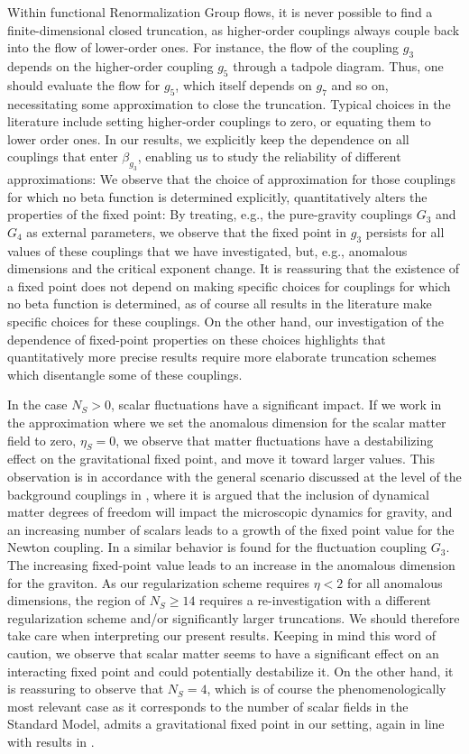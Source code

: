 \documentclass[11pt]{book} %
\begin{document}
Within functional Renormalization Group flows, it is never possible to find a finite-dimensional
closed truncation, as higher-order couplings always couple back into the flow of lower-order ones.
For instance, the flow of the coupling $g_3$ depends on the higher-order coupling $g_5$ through
a tadpole diagram. Thus, one should evaluate the flow for $g_5$,
which itself depends on $g_7$ and so on, necessitating some approximation to close the truncation.
Typical choices in the literature include setting higher-order couplings to zero,
or equating them to lower order ones. In our results,
we explicitly keep the dependence on all couplings that enter $\beta_{g_3}$,
enabling us to study the reliability of different approximations:
We observe that the choice of approximation for those couplings for which no beta function is
determined explicitly, quantitatively alters the properties of the fixed point: By treating,
e.g., the pure-gravity couplings $G_3$ and $G_4$ as external parameters, we observe that the
fixed point in $g_3$ persists for all values of these couplings that we have investigated,
but, e.g., anomalous dimensions and the critical exponent change.
It is reassuring that the existence of a fixed point does not  depend on making specific choices
for couplings for which no beta function is determined, as of course all results in the literature
make specific choices for these couplings. On the other hand,
our investigation of the dependence of fixed-point properties on these choices highlights that quantitatively
more precise results require
 more elaborate truncation schemes which disentangle some of these couplings.


In the case $N_S>0$, scalar fluctuations have a significant impact.
If we work in the approximation where we set the anomalous dimension for the scalar matter field to zero,
$\eta_S=0$, we observe that matter fluctuations  have a destabilizing effect on the gravitational fixed point,
and move it toward larger values.
This observation is in accordance with the general scenario discussed at the level of the
background couplings in \cite{Dona:2013qba, Dona:2014pla},
where it is argued that the inclusion of dynamical matter degrees of freedom will impact
the microscopic dynamics for gravity, and an increasing number of scalars leads to a growth of the
fixed point value for the Newton coupling. In \cite{Meibohm:2015twa} a similar behavior
is found for the fluctuation coupling $G_3$.
The increasing fixed-point value leads to an increase in the anomalous dimension for the graviton.
As our regularization scheme requires $\eta<2$ for all anomalous dimensions,
the region of $N_S \geq 14$ requires a re-investigation with a different regularization
scheme and/or significantly larger truncations.
We should therefore take care when interpreting our present results.
Keeping in mind this word of caution, we observe that scalar matter seems to have a significant
effect on an interacting fixed point and could potentially destabilize it.
On the other hand, it is reassuring to observe that $N_S=4$,
which is of course the phenomenologically most relevant case as it corresponds to the number of
scalar fields in the Standard Model,
admits a gravitational fixed point in our setting,
again in line with results in \cite{Dona:2013qba, Dona:2014pla, Meibohm:2015twa}.
\end{document}
